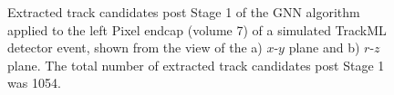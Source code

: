 \begin{figure}[htbp]%
    \centering
    \hfill
    \caption{Extracted track candidates post Stage 1 of the GNN algorithm applied to the left Pixel endcap (volume 7) of a simulated TrackML detector event, shown from the view of the a) $x$-$y$ plane and b) $r$-$z$ plane. The total number of extracted track candidates post Stage 1 was 1054.}%
    \label{fig:trackml-results-endcap-extracted}%
\end{figure}

